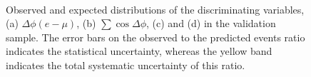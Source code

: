 \begin{figure}[ht!]
     \begin{center}

        \\

    \end{center}
    \caption{ Observed and expected distributions of the discriminating variables, (a) $\Delta\phi(e-\mu)$,
      (b) $\sum\cos\Delta\phi$, (c) \SumLtMET and (d) \Ht  in the \ttbar validation sample.
	The error bars on the observed to the predicted events ratio indicates the statistical uncertainty,
	whereas the yellow band indicates the total systematic uncertainty of this ratio.} 
 
   \label{fig:cutsttbar}
\end{figure}


